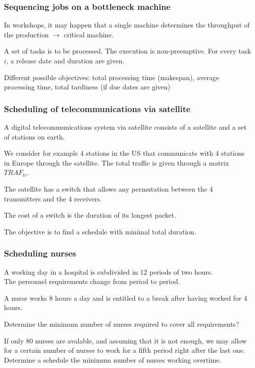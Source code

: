 \documentclass[9pt,handout]{beamer}
\begin{document}
\begin{frame}
\frametitle{Sequencing jobs on a bottleneck machine}
In workshops, it may happen that \alert{a single machine} determines the
throughput of the production $\rightarrow$ \alert{critical machine}.\bigskip

\noindent
A set of tasks is to be processed. The execution is \alert{non-preemptive}.
For every task $i$, a \alert{release date} and \alert{duration} are given.\bigskip

\noindent
Different \alert{possible objectives}: total processing time (\alert{makespan}),
average processing time, total tardiness (if \alert{due dates} are given)
\end{frame}
\begin{frame}
\frametitle{Scheduling of telecommunications via satellite}
A digital telecommunications system via satellite consists of
\alert{a satellite} and a \alert{set of stations on earth}.\bigskip

\noindent
We consider for example 4 stations in the US that communicate with 4 stations
in Europe through the satellite. The total traffic is given through a matrix $TRAF_{tr}$.\bigskip

\noindent
The satellite has a switch that allows \alert{any permutation} between the 4 transmitters and the 4 receivers.
\bigskip

\noindent
The \alert{cost} of a switch is the duration of its \alert{longest packet}.\bigskip

\noindent
The objective is to find a schedule with \alert{minimal total duration}.
\end{frame}
\begin{frame}
\frametitle{Scheduling nurses}
A working day in a hospital is subdivided in 12 periods of two hours.\\
The personnel requirements change from period to period.\bigskip

\noindent
A nurse works \alert{8 hours a day} and is entitled to a \alert{break} after having worked for 4 hours.\bigskip

\noindent
Determine the \alert{minimum number} of nurses required to cover all requirements?\bigskip

\noindent
If only \alert{80 nurses} are avalable, and assuming that it is \alert{not enough},
we may allow for a certain number of nurses to work for a \alert{fifth period}
right after the last one. Determine a schedule the minimum number of nurses
working overtime.
\end{frame}
\end{document}
